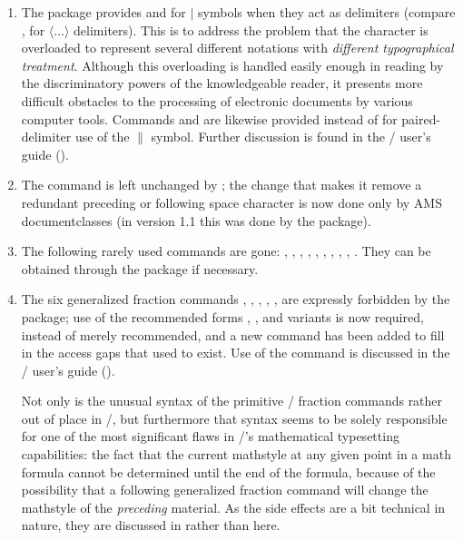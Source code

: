 \documentclass{amsdtx}
\begin{document}
\begin{enumerate}
\item The  package provides  and  for
$\vert$ symbols when they act as delimiters (compare ,
 for $\langle\ldots\rangle$ delimiters). This is to address
the problem that the \qc{\|} character is overloaded to represent
several different notations with \emph{different typographical
treatment}. Although this overloading is handled easily enough in
reading by the discriminatory powers of the knowledgeable reader, it
presents more difficult obstacles to the processing of electronic
documents by various computer tools. Commands  and 
are likewise provided instead of \cn{\|} for paired-delimiter use of
the $\|$ symbol. Further discussion is found in the \amslatex/ user's
guide ().

\item The \qc{\~} command is left unchanged by ; the change
that makes it remove a redundant preceding or following space character
is now done only by AMS documentclasses (in version 1.1 this was done by
the  package).

\item The following rarely used commands are gone: ,
, , , , ,
, , , . They can be obtained
through the  package if necessary.

\item The six generalized fraction commands ,
, , , ,
 are expressly forbidden by the 
package; use of the recommended forms , , and
variants is now required, instead of merely recommended, and a new
command  has been added to fill in the access gaps that used
to exist. Use of the  command is discussed in the \amslatex/
user's guide ().

Not only is the unusual syntax of the primitive \tex/ fraction commands
rather out of place in \latex/, but furthermore that syntax seems to be
solely responsible for one of the most significant flaws in \tex/'s
mathematical typesetting capabilities: the fact that the current
mathstyle at any given point in a math formula cannot be determined
until the end of the formula, because of the possibility that a
following generalized fraction command will change the mathstyle of the
\emph{preceding} material. As the side effects are a bit technical in
nature, they are discussed in  rather than here.


\end{enumerate}
\end{document}
